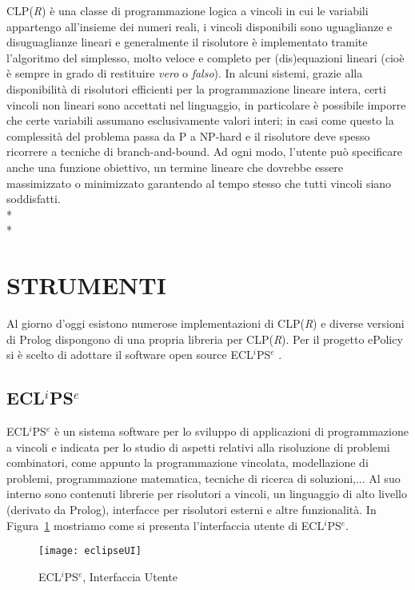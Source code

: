 \documentclass[12pt,a4paper,openright,twoside]{report}
\begin{document}
CLP(\emph{R}) è una classe di programmazione logica a vincoli in cui le variabili appartengo all'insieme dei numeri reali, i vincoli disponibili sono uguaglianze e disuguaglianze lineari e generalmente il risolutore è implementato tramite l'algoritmo del simplesso, molto veloce e completo per (dis)equazioni lineari (cioè è sempre in grado di restituire \emph{vero} o \emph{falso}). In alcuni sistemi, grazie alla disponibilità di risolutori efficienti per la programmazione lineare intera, certi vincoli non lineari sono accettati nel linguaggio, in particolare è possibile imporre che certe variabili assumano esclusivamente valori interi; in casi come questo la complessità del problema passa da P a NP-hard e il risolutore deve spesso ricorrere a tecniche di branch-and-bound. Ad ogni modo, l'utente può specificare anche una funzione obiettivo, un termine lineare che dovrebbe essere massimizzato o minimizzato garantendo al tempo stesso che tutti vincoli siano soddisfatti.\\*\\*


\section{STRUMENTI}
Al giorno d'oggi esistono numerose implementazioni di CLP(\emph{R}) \cite{inclpR} e diverse versioni di Prolog dispongono di una propria libreria per CLP(\emph{R}). Per il progetto ePolicy si è scelto di adottare il software open source  ECL$^i$PS$^e$ \cite{clpEclipse,fromLPtoCLPeclipse}.

\subsection{ECL$^i$PS$^e$}
ECL$^i$PS$^e$ è un sistema software per lo sviluppo di applicazioni di programmazione a vincoli e indicata per lo studio di aspetti relativi alla risoluzione di problemi combinatori, come appunto la programmazione vincolata, modellazione di problemi, programmazione matematica, tecniche di ricerca di soluzioni,... Al suo interno sono contenuti librerie per risolutori a vincoli, un linguaggio di alto livello (derivato da Prolog), interfacce per risolutori esterni e altre funzionalità. In Figura~\ref{eclipseUI} mostriamo come si presenta l'interfaccia utente di ECL$^i$PS$^e$.

\begin{figure}[h]
	\centering
	\texttt{[image: eclipseUI]}
	\caption{ECL$^i$PS$^e$, Interfaccia Utente}
	\label{eclipseUI}
\end{figure}
\end{document}
